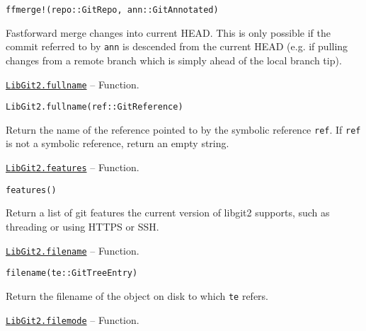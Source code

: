 \begin{adjustwidth}{2em}{0pt}


\begin{verbatim}
ffmerge!(repo::GitRepo, ann::GitAnnotated)
\end{verbatim}

Fastforward merge changes into current HEAD. This is only possible if the commit referred to by \texttt{ann} is descended from the current HEAD (e.g. if pulling changes from a remote branch which is simply ahead of the local branch tip).



\end{adjustwidth}
\hypertarget{2268784022172298907}{} 
\hyperlink{2268784022172298907}{\texttt{LibGit2.fullname}}  -- {Function.}

\begin{adjustwidth}{2em}{0pt}


\begin{verbatim}
LibGit2.fullname(ref::GitReference)
\end{verbatim}

Return the name of the reference pointed to by the symbolic reference \texttt{ref}. If \texttt{ref} is not a symbolic reference, return an empty string.



\end{adjustwidth}
\hypertarget{15490475873131507647}{} 
\hyperlink{15490475873131507647}{\texttt{LibGit2.features}}  -- {Function.}

\begin{adjustwidth}{2em}{0pt}


\begin{verbatim}
features()
\end{verbatim}

Return a list of git features the current version of libgit2 supports, such as threading or using HTTPS or SSH.



\end{adjustwidth}
\hypertarget{4260849105857148209}{} 
\hyperlink{4260849105857148209}{\texttt{LibGit2.filename}}  -- {Function.}

\begin{adjustwidth}{2em}{0pt}


\begin{verbatim}
filename(te::GitTreeEntry)
\end{verbatim}

Return the filename of the object on disk to which \texttt{te} refers.



\end{adjustwidth}
\hypertarget{10756827966829509667}{} 
\hyperlink{10756827966829509667}{\texttt{LibGit2.filemode}}  -- {Function.}

